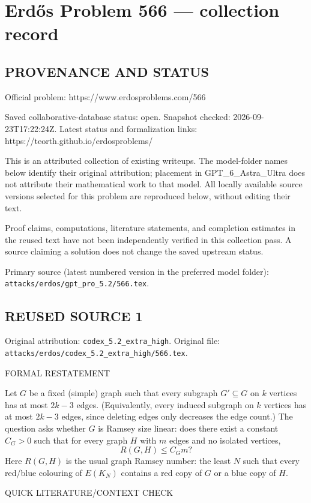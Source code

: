 \section*{Erd\H{o}s Problem 566 --- collection record}

\subsection*{PROVENANCE AND STATUS}
Official problem: https://www.erdosproblems.com/566

Saved collaborative-database status: open.
Snapshot checked: 2026-09-23T17:22:24Z.
Latest status and formalization links: https://teorth.github.io/erdosproblems/

This is an attributed collection of existing writeups. The model-folder names below identify their original attribution; placement in GPT\_6\_Astra\_Ultra does not attribute their mathematical work to that model. All locally available source versions selected for this problem are reproduced below, without editing their text.

Proof claims, computations, literature statements, and completion estimates in the reused text have not been independently verified in this collection pass. A source claiming a solution does not change the saved upstream status.

Primary source (latest numbered version in the preferred model folder): \texttt{attacks/erdos/gpt\_pro\_5.2/566.tex}.

\subsection*{REUSED SOURCE 1}
Original attribution: \texttt{codex\_5.2\_extra\_high}.
Original file: \texttt{attacks/erdos/codex\_5.2\_extra\_high/566.tex}.

FORMAL RESTATEMENT

Let $G$ be a fixed (simple) graph such that every subgraph $G'\subseteq G$ on $k$ vertices has at most $2k-3$ edges.
(Equivalently, every induced subgraph on $k$ vertices has at most $2k-3$ edges, since deleting edges only decreases the edge count.)
The question asks whether $G$ is Ramsey size linear:
does there exist a constant $C_G>0$ such that for every graph $H$ with $m$ edges and no isolated vertices,
\[
R(G,H) \le C_G m ?
\]
Here $R(G,H)$ is the usual graph Ramsey number: the least $N$ such that every red/blue colouring of $E(K_N)$ contains a red copy of $G$ or a blue copy of $H$.

QUICK LITERATURE/CONTEXT CHECK

